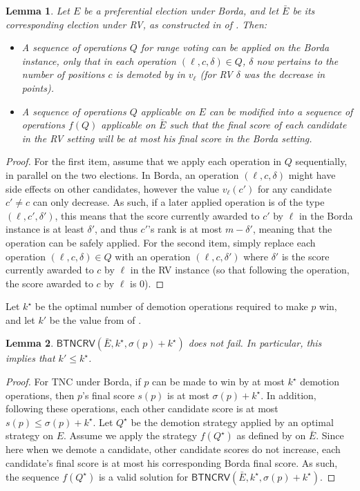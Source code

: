 \documentclass[letterpaper]{article} %
\newtheorem{lemma}{Lemma}
\newcommand{\SB}{\textsc{TNC}}
\newcommand{\CF}{\mathsf{BTNCRV}}
\begin{document}
\begin{lemma}\label{lem:corresponding}
Let $E$ be a preferential election under Borda, and let $\bar{E}$ be its corresponding election under RV, as constructed in  of . Then:
\begin{itemize}
    \item A sequence of operations $Q$ for range voting can be applied on the Borda instance, only that in each operation $(\ell, c, \delta) \in Q$, $\delta$ now pertains to the number of positions $c$ is demoted by in $v_\ell$ (for  RV $\delta$ was the decrease in points).
    \item A sequence of operations $Q$ applicable on $E$ can be modified into a sequence of operations $f(Q)$  applicable on $\bar{E}$ such that the final score of each candidate in the RV setting will be at most his final score in the Borda setting.
\end{itemize}
\end{lemma}
\begin{proof}
For the first item, assume that we apply each operation in $Q$ sequentially, in parallel on the two elections. In Borda, an operation $(\ell, c, \delta)$ might have side effects on other candidates, however the value $v_{\ell}(c')$ for any  candidate $c' \neq c$ can only decrease. As such, if a later applied operation is of the type $(\ell, c' ,\delta')$, this means that the score currently awarded to $c'$ by $\ell$ in the Borda instance is at least $\delta'$, and thus $c'$'s rank is at most $m-\delta'$, meaning that the operation can be safely applied.
For the second item, simply replace each  operation $(\ell, c, \delta) \in Q$ with an operation $(\ell,c,\delta')$ where $\delta'$ is the score currently awarded to $c$ by $\ell$ in the RV instance (so that following the operation, the score  awarded to $c$ by $\ell$ is $0$).
\end{proof}
Let $k^{\star}$  be the optimal number of demotion operations required to make $p$ win, and let $k'$ be the value from  of .
\begin{lemma} \label{k-star-consequenceFreeLemma}
$\CF(\bar{E},k^{\star},\sigma(p)+k^{\star})$ does not fail. In particular, this implies that $k' \leq k^{\star}$.
\end{lemma}
\begin{proof}
For \SB{} under Borda, if $p$ can be made to win by at most $k^\star$ demotion operations, then $p$'s final score $s(p)$ is at most $\sigma(p)+k^\star$. In addition, following these operations, each other candidate score is at most $s(p) \leq \sigma(p)+k^\star$. Let $Q^\star$ be the demotion strategy applied by an optimal strategy on $E$. Assume we apply the strategy $f(Q^\star)$ as defined by  on $\bar{E}$. Since here when we demote a candidate, other candidate scores do not increase, each candidate's final score is at most his corresponding Borda final score. As such, the sequence $f(Q^\star)$ is a valid solution for $\CF(\bar{E},k^{\star},\sigma(p)+k^{\star})$.
\end{proof}
\end{document}
